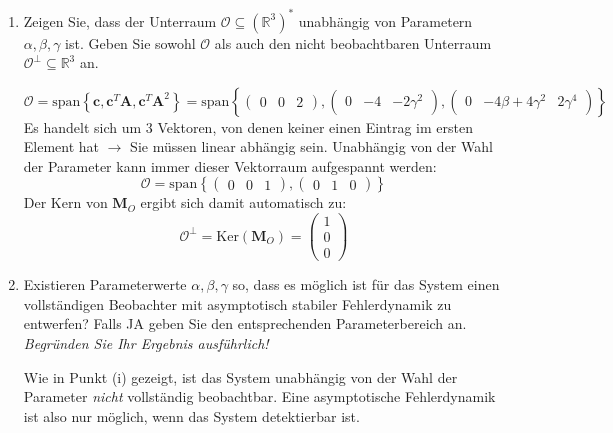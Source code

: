 \documentclass[crop=false]{standalone}
\begin{document}
\begin{task}
 \begin{enumerate}[i]
     \item Zeigen Sie, dass der Unterraum $\mathcal{O} \subseteq\left(\mathbb{R}^{3}\right)^{*}$ unabhängig von Parametern
$\alpha, \beta, \gamma$ ist. Geben Sie sowohl $\mathcal{O}$ als auch den nicht beobachtbaren Unterraum
$\mathcal{O}^{\perp} \subseteq \mathbb{R}^{3}$ an.
     \begin{solution}
     \[\mathcal{O} = \text{span}\left\{ \mathbf{c}, \mathbf{c}^T \mathbf{A}, \mathbf{c}^T \mathbf{A}^2 \right\} = \text{span}\left\{ 
     \begin{pmatrix}0 & 0 & 2\end{pmatrix},\begin{pmatrix}0 & -4 & -2\gamma^2\end{pmatrix},
     \begin{pmatrix}0 & -4\beta+4\gamma^2 & 2\gamma^4\end{pmatrix}
     \right\}
     \]
     Es handelt sich um 3 Vektoren, von denen keiner einen Eintrag im ersten Element hat $\rightarrow$ Sie müssen linear abhängig sein. Unabhängig von der Wahl der Parameter kann immer dieser Vektorraum aufgespannt werden:
     \[ \mathcal{O} =\text{span}\left\{ 
     \begin{pmatrix}0 & 0 & 1\end{pmatrix},\begin{pmatrix}0 & 1 & 0\end{pmatrix}
     \right\} \]
     Der Kern von $\mathbf{M}_O$ ergibt sich damit automatisch zu:
     \[ \mathcal{O}^\perp=\text{Ker}(\mathbf{M}_O) = \begin{pmatrix}1\\0\\0\end{pmatrix}\]
     \end{solution}
     \item Existieren Parameterwerte $\alpha, \beta, \gamma$ so, dass es möglich ist für das System einen vollständigen Beobachter mit asymptotisch stabiler Fehlerdynamik zu entwerfen? Falls JA geben Sie den entsprechenden Parameterbereich an.
     \emph{Begründen Sie Ihr Ergebnis ausführlich!}
 \begin{solution}
 Wie in Punkt (i) gezeigt, ist das System unabhängig von der Wahl der Parameter \emph{nicht} vollständig beobachtbar. Eine asymptotische Fehlerdynamik ist also nur möglich, wenn das System detektierbar ist.
 

\end{solution}
\end{enumerate}
\end{task}
\end{document}
